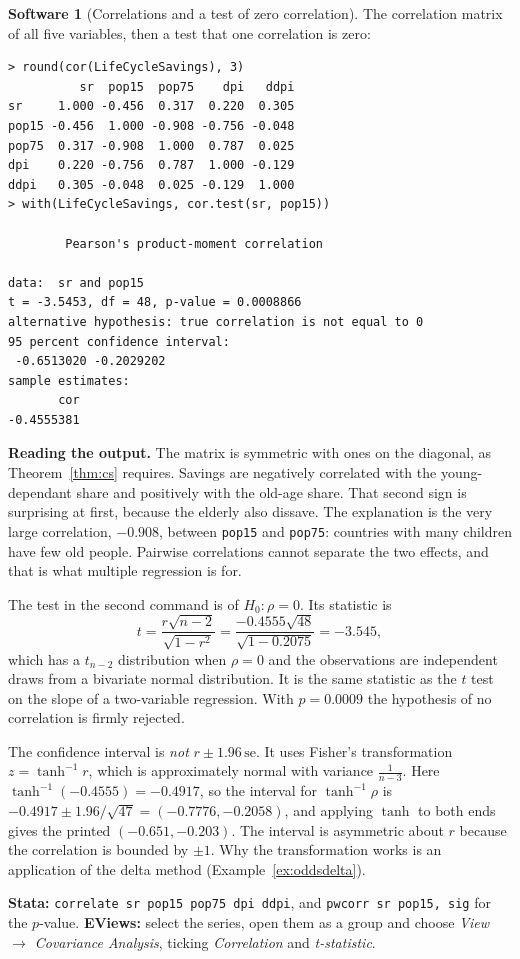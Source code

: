 \documentclass[11pt,a4paper]{article}
\numberwithin{equation}{section}
\theoremstyle{definition}
\newtheorem{software}[thm]{Software}
\begin{document}
\begin{software}[Correlations and a test of zero correlation]
\label{sw:cor}
The correlation matrix of all five variables, then a test that one correlation is zero:
{\small\begin{verbatim}
> round(cor(LifeCycleSavings), 3)
          sr  pop15  pop75    dpi   ddpi
sr     1.000 -0.456  0.317  0.220  0.305
pop15 -0.456  1.000 -0.908 -0.756 -0.048
pop75  0.317 -0.908  1.000  0.787  0.025
dpi    0.220 -0.756  0.787  1.000 -0.129
ddpi   0.305 -0.048  0.025 -0.129  1.000
> with(LifeCycleSavings, cor.test(sr, pop15))

        Pearson's product-moment correlation

data:  sr and pop15
t = -3.5453, df = 48, p-value = 0.0008866
alternative hypothesis: true correlation is not equal to 0
95 percent confidence interval:
 -0.6513020 -0.2029202
sample estimates:
       cor
-0.4555381
\end{verbatim}}
\textbf{Reading the output.} The matrix is symmetric with ones on the diagonal, as Theorem~\ref{thm:cs} requires. Savings are negatively correlated
with the young-dependant share and positively with the old-age share. That second sign is surprising at first, because the elderly also
dissave. The explanation is the very large correlation, $-0.908$, between \texttt{pop15} and \texttt{pop75}: countries with many children have few
old people. Pairwise correlations cannot separate the two effects, and that is what multiple regression is for.

The test in the second command is of $H_0\colon \rho = 0$. Its statistic is
\[
t = \frac{r\sqrt{n-2}}{\sqrt{1 - r^2}} = \frac{-0.4555\sqrt{48}}{\sqrt{1 - 0.2075}} = -3.545 ,
\]
which has a $t_{n-2}$ distribution when $\rho = 0$ and the observations are independent draws from a bivariate normal distribution. It is the
same statistic as the $t$ test on the slope of a two-variable regression. With $p = 0.0009$ the hypothesis of no correlation is
firmly rejected.

The confidence interval is \emph{not} $r \pm 1.96\,\mathrm{se}$. It uses Fisher's transformation $z = \tanh^{-1} r$, which is approximately
normal with variance $\frac{1}{n-3}$. Here $\tanh^{-1}(-0.4555) = -0.4917$, so the interval for $\tanh^{-1}\rho$ is
$-0.4917 \pm 1.96/\sqrt{47} = (-0.7776, -0.2058)$, and applying $\tanh$ to both ends gives the printed $(-0.651, -0.203)$. The interval is
asymmetric about $r$ because the correlation is bounded by $\pm 1$. Why the transformation works is an application of the delta method
(Example~\ref{ex:oddsdelta}).

\textbf{Stata:} \texttt{correlate sr pop15 pop75 dpi ddpi}, and \texttt{pwcorr sr pop15, sig} for the $p$-value. \textbf{EViews:} select the
series, open them as a group and choose \emph{View $\to$ Covariance Analysis}, ticking \emph{Correlation} and \emph{t-statistic}.
\end{software}
\end{document}
